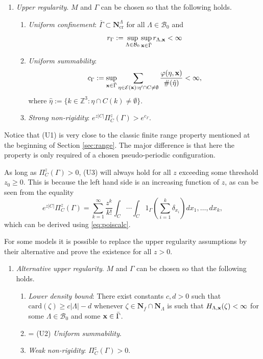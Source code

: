 \begin{enumerate}[\textbf{(U)}] 
	\item \textit{Upper regularity}. $M$ and $\Gamma$ can be chosen so that the following holds. 
		\begin{enumerate}[(U1)]
			\item \textit{Uniform confinement}: $\bar \Gamma \subset \mathbf N^\Lambda_\text{cr}$ for all $\Lambda \in \mathcal B_0$ and 
				\begin{equation}\label{eq:U1}r_\Gamma := \sup_{\Lambda\in\mathcal B_0}\sup_{{\mathbf{x}} \in \bar\Gamma} r_{\Lambda, {\mathbf{x}}} < \infty\end{equation}
			\item \textit{Uniform summability}: 
			$$c_\Gamma := \sup_{{\mathbf{x}} \in \bar\Gamma}  \sum_{\eta \in \mathcal E({\mathbf{x}}): \eta' \cap C \neq \emptyset} \frac{\varphi(\eta,{\mathbf{x}})}{\#(\hat\eta)} < \infty,$$
where $\hat\eta := \{k \in \mathbb Z^3: \eta \cap C(k) \neq \emptyset\}$.
\item \textit{Strong non-rigidity}: $e^{z|C|} \Pi^z_C(\Gamma) > e^{c_\Gamma}$.
		\end{enumerate}
\end{enumerate}

Notice that (U1) is very close to the classic finite range property mentioned at the beginning of Section \ref{sec:range}. The major difference is that here the property is only required of a chosen pseudo-periodic configuration.


As long as $\Pi^z_C (\Gamma) >0$, (U3) will always hold for all $z$ exceeding some threshold $z_0 \geq 0$. This is because the left hand side is an increasing function of $z$, as can be seen from the equality 
$$e^{z|C|} \Pi^z_C(\Gamma) = \sum^\infty_{k=1} \frac{z^k}{k!} \int_C \cdots \int_C 1_{\Gamma} \left(\sum^k_{i=1} \delta_{x_i}\right) dx_1, \dots, dx_k,$$
which can be derived using \eqref{eq:poiscalc}. 



For some models it is possible to replace the upper regularity assumptions by their alternative and prove the existence for all $z>0$.

\begin{enumerate}[(\textbf{\^{U}})]
	\item \textit{Alternative upper regularity}. $M$ and $\Gamma$ can be chosen so that the following holds.
	\begin{enumerate}[(\^U1)]
		\item \textit{Lower density bound}: There exist constants $c,d > 0$ such that $\mathrm{card}(\zeta) \geq c|\Lambda| - d$ whenever $\zeta \in \mathbf N_f\cap\mathbf  N_\Lambda$ is such that $H_{\Lambda,{\mathbf{x}}}(\zeta)<\infty$ for some $\Lambda \in \mathcal B_0$ and some ${\mathbf{x}} \in \bar\Gamma$.
		\item = (U2) \textit{Uniform summability}.
		\item \textit{Weak non-rigidity}: $\Pi^z_C(\Gamma) > 0$.
	\end{enumerate}
\end{enumerate}






